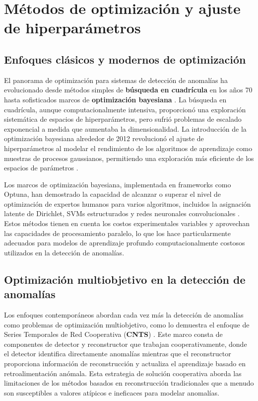 \section{Métodos de optimización y ajuste de hiperparámetros}
\subsection{Enfoques clásicos y modernos de optimización}

El panorama de optimización para sistemas de detección de anomalías ha evolucionado desde métodos simples de \textbf{búsqueda en cuadrícula} en los años 70 \cite{noauthor_adaptation_nodate} hasta sofisticados marcos de \textbf{optimización bayesiana} \cite{snoek_practical_2012}. La búsqueda en cuadrícula, aunque computacionalmente intensiva, proporcionó una exploración sistemática de espacios de hiperparámetros, pero sufrió problemas de escalado exponencial a medida que aumentaba la dimensionalidad. La introducción de la optimización bayesiana alrededor de 2012 revolucionó el ajuste de hiperparámetros al modelar el rendimiento de los algoritmos de aprendizaje como muestras de procesos gaussianos, permitiendo una exploración más eficiente de los espacios de parámetros \cite{noauthor_adaptation_nodate}.

Los marcos de optimización bayesiana, implementada en frameworks como Optuna, han demostrado la capacidad de alcanzar o superar el nivel de optimización de expertos humanos para varios algoritmos, incluidos la asignación latente de Dirichlet, SVMs estructurados y redes neuronales convolucionales \cite{noauthor_adaptation_nodate}. Estos métodos tienen en cuenta los costos experimentales variables y aprovechan las capacidades de procesamiento paralelo, lo que los hace particularmente adecuados para modelos de aprendizaje profundo computacionalmente costosos utilizados en la detección de anomalías.



\subsection{Optimización multiobjetivo en la detección de anomalías}

Los enfoques contemporáneos abordan cada vez más la detección de anomalías como problemas de optimización multiobjetivo, como lo demuestra el enfoque de Series Temporales de Red Cooperativa (\textbf{CNTS}) \cite{yang_cnts_2023}. Este marco consta de componentes de detector y reconstructor que trabajan cooperativamente, donde el detector identifica directamente anomalías mientras que el reconstructor proporciona información de reconstrucción y actualiza el aprendizaje basado en retroalimentación anómala. Esta estrategia de solución cooperativa aborda las limitaciones de los métodos basados en reconstrucción tradicionales que a menudo son susceptibles a valores atípicos e ineficaces para modelar anomalías.